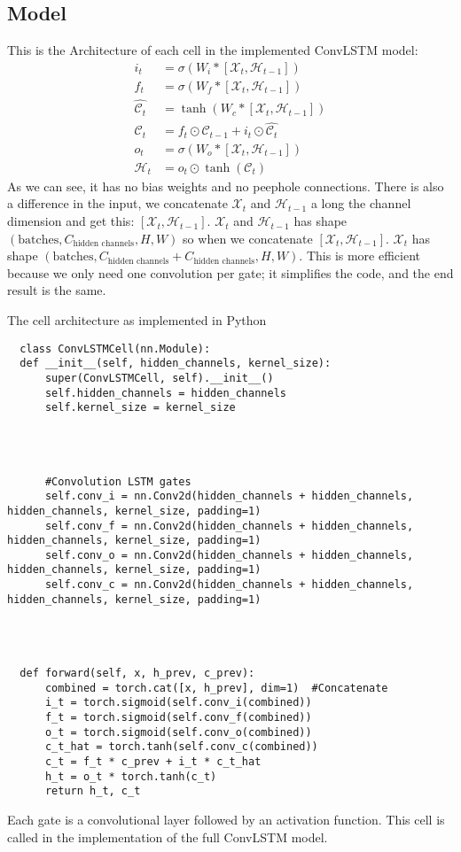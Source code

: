 \documentclass[a4paper,12pt]{article}
\begin{document}
\subsection{Model}
This is the Architecture of each cell in the implemented ConvLSTM model:
\begin{align}
i_t &= \sigma(W_{i} * [\mathcal{X}_t, \mathcal{H}_{t-1}]) \\
f_t &= \sigma(W_{f} * [\mathcal{X}_t, \mathcal{H}_{t-1}]) \\
\hat{\mathcal{C}_t} &= \tanh(W_{c} * [\mathcal{X}_t, \mathcal{H}_{t-1}])\\
\mathcal{C}_t &= f_t \odot \mathcal{C}_{t-1} + i_t \odot \hat{\mathcal{C}_t} \\
o_t &= \sigma(W_{o} * [\mathcal{X}_t, \mathcal{H}_{t-1}]) \\
\mathcal{H}_t &= o_t \odot \tanh(\mathcal{C}_t)
\end{align}
As we can see, it has no bias weights and no peephole connections.
There is also a difference in the input, we concatenate $\mathcal{X}_t$ and $\mathcal{H}_{t-1}$ a long the channel dimension and get this: $[\mathcal{X}_t, \mathcal{H}_{t-1}]$. $\mathcal{X}_t$ and $\mathcal{H}_{t-1}$ has shape $(\text{batches}, C_{\text{hidden channels}}, H, W)$ so when we concatenate $[\mathcal{X}_t, \mathcal{H}_{t-1}]$. $\mathcal{X}_t$ has shape $(\text{batches}, C_{\text{hidden channels}}+C_{\text{hidden channels}}, H, W)$.
This is more efficient because we only need one convolution per gate; it simplifies the code, and the end result is the same.




The cell architecture as implemented in Python
\begin{lstlisting}
  class ConvLSTMCell(nn.Module):
  def __init__(self, hidden_channels, kernel_size):
      super(ConvLSTMCell, self).__init__()
      self.hidden_channels = hidden_channels
      self.kernel_size = kernel_size




      #Convolution LSTM gates
      self.conv_i = nn.Conv2d(hidden_channels + hidden_channels, hidden_channels, kernel_size, padding=1)
      self.conv_f = nn.Conv2d(hidden_channels + hidden_channels, hidden_channels, kernel_size, padding=1)
      self.conv_o = nn.Conv2d(hidden_channels + hidden_channels, hidden_channels, kernel_size, padding=1)
      self.conv_c = nn.Conv2d(hidden_channels + hidden_channels, hidden_channels, kernel_size, padding=1)




  def forward(self, x, h_prev, c_prev):
      combined = torch.cat([x, h_prev], dim=1)  #Concatenate
      i_t = torch.sigmoid(self.conv_i(combined))
      f_t = torch.sigmoid(self.conv_f(combined))
      o_t = torch.sigmoid(self.conv_o(combined))
      c_t_hat = torch.tanh(self.conv_c(combined))
      c_t = f_t * c_prev + i_t * c_t_hat
      h_t = o_t * torch.tanh(c_t)
      return h_t, c_t
\end{lstlisting}
Each gate is a convolutional layer followed by an activation function. This cell is called in the implementation of the full ConvLSTM model.
\end{document}
